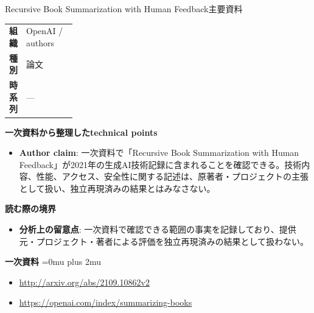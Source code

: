 \begin{technicalnote}{Recursive Book Summarization with Human Feedback}{主要資料}
\begingroup
\begin{tabularx}{\linewidth}{@{}>{\bfseries}p{0.22\linewidth}X@{}}
組織 & OpenAI / authors \\
種別 & 論文 \\
時系列 & — \\
\end{tabularx}
\smallskip
{\bfseries 一次資料から整理したtechnical points}
\begin{itemize}[leftmargin=1.5em,itemsep=0.35em]
\item \textbf{Author claim}: 一次資料で「Recursive Book Summarization with Human Feedback」が2021年の生成AI技術記録に含まれることを確認できる。技術内容、性能、アクセス、安全性に関する記述は、原著者・プロジェクトの主張として扱い、独立再現済みの結果とはみなさない。
\end{itemize}
\begin{minipage}{\linewidth}
{\bfseries 読む際の境界}
\begin{itemize}[leftmargin=1.5em,itemsep=0.35em]
\item \textbf{分析上の留意点}: 一次資料で確認できる範囲の事実を記録しており、提供元・プロジェクト・著者による評価を独立再現済みの結果として扱わない。
\end{itemize}
\begin{samepage}
{\bfseries 一次資料}
\begingroup\sloppy
\Urlmuskip=0mu plus 2mu\relax
\begin{itemize}[leftmargin=1.5em,itemsep=0.25em]
\item {\scriptsize\url{http://arxiv.org/abs/2109.10862v2}}
\item {\scriptsize\url{https://openai.com/index/summarizing-books}}
\end{itemize}
\endgroup
\end{samepage}
\end{minipage}
\endgroup
\end{technicalnote}
\medskip

